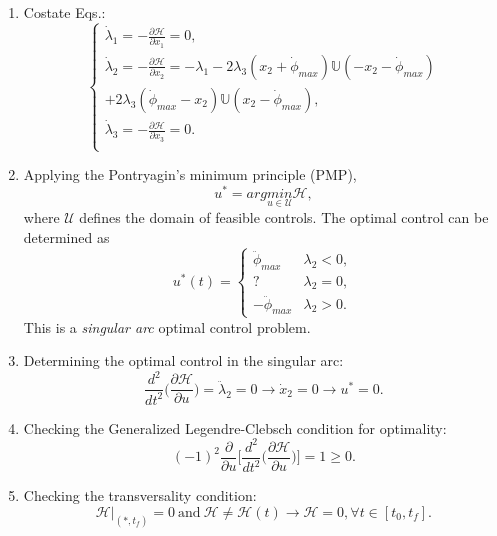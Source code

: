 \documentclass[journal ]{new-aiaa}
\begin{document}
\begin{enumerate}
		\item Costate Eqs.:
		\begin{equation}
		\left\{\begin{array}{l}
		\dot{\lambda}_1=-\frac{\partial{\mathscr{H}}}{\partial{x_1}}=0,\\
		\dot{\lambda}_2=-\frac{\partial{\mathscr{H}}}{\partial{x_2}}=-\lambda_1-2\lambda_3(x_2+\dot{\phi}_{max})\mathbb{U}(-x_2-\dot{\phi}_{max})\\
		+2\lambda_3(\dot{\phi}_{max}-x_2)\mathbb{U}(x_2-\dot{\phi}_{max}),\\
		\dot{\lambda}_3=-\frac{\partial{\mathscr{H}}}{\partial{x_3}}=0.\\
		\end{array}
		\right.
		\end{equation}
		\item Applying the Pontryagin's minimum principle (PMP),
		\begin{equation}
		u^*=arg \underset{u\in\mathcal{U}}{min} \mathscr{H},
		\end{equation}
		where $\mathcal{U}$ defines the domain of feasible controls. The optimal control can be determined as
		\begin{equation}
		u^*(t)=\left\{
		\begin{array}{ll}
		\ddot{\phi}_{max}&\lambda_2<0,\\
		?& \lambda_2=0,\\
		-\ddot{\phi}_{max}&\lambda_2>0.
		\end{array}
		\right.
		\end{equation}
		This is a {\it singular arc} optimal control problem.
		
		
		\item Determining the optimal control in the singular arc:
		\begin{equation}
		\frac{d^2}{dt^2}\Big(\frac{\partial \mathscr{H}}{\partial u}\Big)=\ddot{\lambda}_2=0\rightarrow \dot{x}_2=0\rightarrow u^*=0.
		\end{equation}
		\item Checking the Generalized Legendre-Clebsch condition for optimality:
		\begin{equation}
		(-1)^2\frac{\partial}{\partial u}\Big[\frac{d^2}{dt^2}\Big(\frac{\partial \mathscr{H}}{\partial u}\Big)\Big]=1\geq 0.
		\end{equation}
		\item Checking the transversality condition:
		\begin{equation}
		\mathscr{H}|_{(*,t_f)}=0\  \text{and} \ \mathscr{H}\neq\mathscr{H}(t)\rightarrow \mathscr{H}=0, \forall t\in[t_0, t_f].
		\end{equation}
	\end{enumerate}
	
\end{document}
